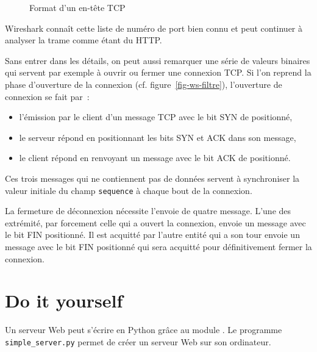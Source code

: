 \begin{figure}[tbp]
{
	} %

\caption{Format d'un en-tête TCP}
\label{fig-header-TCP}
\end{figure}


Wireshark connaît cette liste de numéro de port bien connu et peut continuer à analyser la trame comme étant du HTTP.

Sans entrer dans les détails, on peut aussi remarquer une série de valeurs binaires qui servent par exemple à ouvrir ou fermer une connexion TCP. Si l'on reprend la phase d'ouverture de la connexion (cf. figure~\vref{fig-ws-filtre}), l'ouverture de connexion se fait par~:
\begin{itemize}
    \item l'émission par le client d'un message TCP avec le bit SYN de positionné,
    \item le serveur répond en positionnant les bits SYN et ACK dans son message,
    \item le client répond en renvoyant un message avec le bit ACK de positionné.
\end{itemize}

Ces trois messages qui ne contiennent pas de données servent à synchroniser la valeur initiale du champ \texttt{sequence} à chaque bout de la connexion.
  
{La fermeture de déconnexion nécessite l'envoie de quatre message. L'une des extrémité, par forcement celle qui a ouvert la connexion, envoie un message avec le bit FIN positionné. Il est acquitté par l'autre entité qui a son tour envoie un message avec le bit FIN positionné qui sera acquitté pour définitivement fermer la connexion.
}   

\section{Do it yourself}

Un serveur Web peut s'écrire en Python grâce au module . Le programme \texttt{simple\_server.py} permet de créer un serveur Web sur son ordinateur.

